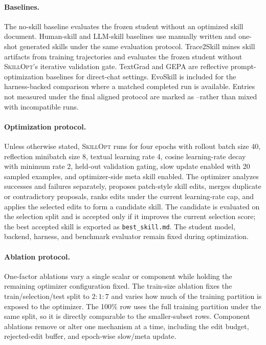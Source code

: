 \documentclass{llmxive}
\providecommand{\ourmethod}{\textsc{SkillOpt}\xspace}
\providecommand{\na}{--}
\begin{document}
\paragraph{Baselines.}
The no-skill baseline evaluates the frozen student without an optimized skill document. Human-skill and LLM-skill baselines use manually written and one-shot generated skills under the same evaluation protocol. Trace2Skill mines skill artifacts from training trajectories and evaluates the frozen student without \ourmethod{}'s iterative validation gate. TextGrad and GEPA are reflective prompt-optimization baselines for direct-chat settings. EvoSkill is included for the harness-backed comparison where a matched completed run is available. Entries not measured under the final aligned protocol are marked as \na rather than mixed with incompatible runs.

\paragraph{Optimization protocol.}
Unless otherwise stated, \ourmethod{} runs for four epochs with rollout batch size 40, reflection minibatch size 8, textual learning rate 4, cosine learning-rate decay with minimum rate 2, held-out validation gating, slow update enabled with 20 sampled examples, and optimizer-side meta skill enabled. The optimizer analyzes successes and failures separately, proposes patch-style skill edits, merges duplicate or contradictory proposals, ranks edits under the current learning-rate cap, and applies the selected edits to form a candidate skill. The candidate is evaluated on the selection split and is accepted only if it improves the current selection score; the best accepted skill is exported as \texttt{best\_skill.md}. The student model, backend, harness, and benchmark evaluator remain fixed during optimization.

\paragraph{Ablation protocol.}
One-factor ablations vary a single scalar or component while holding the remaining optimizer configuration fixed. The train-size ablation fixes the train/selection/test split to $2{:}1{:}7$ and varies how much of the training partition is exposed to the optimizer. The 100\% row uses the full training partition under the same split, so it is directly comparable to the smaller-subset rows. Component ablations remove or alter one mechanism at a time, including the edit budget, rejected-edit buffer, and epoch-wise slow/meta update.
\end{document}
